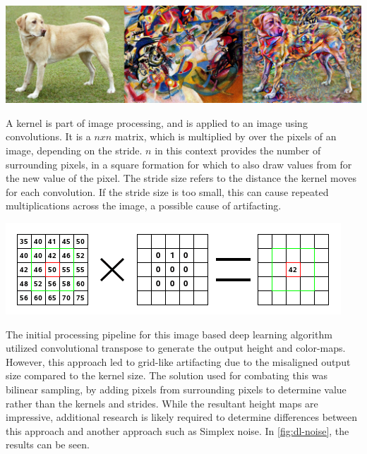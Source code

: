 \documentclass[10pt]{report}
\begin{document}
		\begin{minipage}{\textwidth}
			\centering
			\includegraphics[scale=.3]{stylized-image}
			\label{fig:neural-style}
		\end{minipage}
	
		A kernel is part of image processing, and is applied to an image using convolutions. It is a \(n x n\) matrix, which is multiplied by over the pixels of an image, depending on the stride. \(n\) in this context provides the number of surrounding pixels, in a square formation for which to also draw values from for the new value of the pixel. The stride size refers to the distance the kernel moves for each convolution. If the stride size is too small, this can cause repeated multiplications across the image, a possible cause of artifacting. 
	
		\begin{minipage}{\textwidth}
			\centering
			\includegraphics[scale=1]{convolution-calculate}
			\label{fig:gimp}
		\end{minipage}
		
		The initial processing pipeline for this image based deep learning algorithm utilized convolutional transpose to generate the output height and color-maps. However, this approach led to grid-like artifacting due to the misaligned output size compared to the kernel size. The solution used for combating this was bilinear sampling, by adding pixels from surrounding pixels to determine value rather than the kernels and strides. While the resultant height maps are impressive, additional research is likely required to determine differences between this approach and another approach such as Simplex noise. In \autoref{fig:dl-noise}, the results can be seen. 
		
\end{document}
